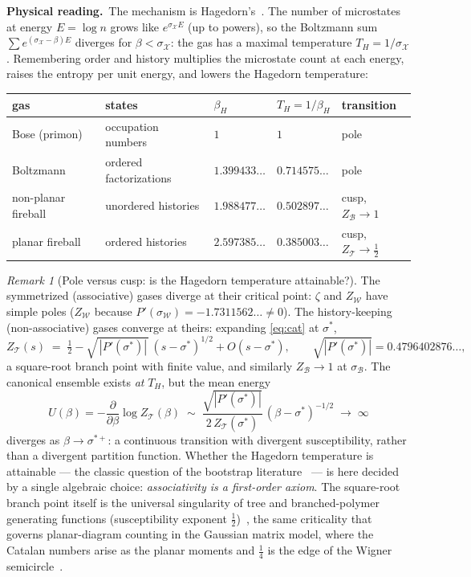 \documentclass[11pt]{article}
\newcommand{\cT}{\mathcal{T}}   %
\newcommand{\cW}{\mathcal{W}}   %
\newcommand{\cB}{\mathcal{B}}   %
\newcommand{\physread}{\medskip\noindent\textbf{Physical reading.}\ }
\numberwithin{equation}{section}
\theoremstyle{plain}
\theoremstyle{definition}
\theoremstyle{remark}
\newtheorem{remark}[theorem]{Remark}
\begin{document}
\physread The mechanism is Hagedorn's~\cite{hagedorn}. The number of microstates at
energy $E = \log n$ grows like $e^{\sigma_{\mathcal X} E}$ (up to powers), so the
Boltzmann sum $\sum e^{(\sigma_{\mathcal X} - \beta)E}$ diverges for
$\beta < \sigma_{\mathcal X}$: the gas has a maximal temperature
$T_H = 1/\sigma_{\mathcal X}$. Remembering order and history multiplies the microstate
count at each energy, raises the entropy per unit energy, and lowers the Hagedorn
temperature:

\begin{center}
\begin{tabular}{@{}lllll@{}}
\toprule
gas & states & $\beta_H$ & $T_H = 1/\beta_H$ & transition \\
\midrule
Bose (primon) & occupation numbers & $1$ & $1$ & pole \\
Boltzmann & ordered factorizations & $1.399433\dots$ & $0.714575\dots$ & pole \\
non-planar fireball & unordered histories & $1.988477\dots$ & $0.502897\dots$ & cusp, $Z_\cB \to 1$ \\
planar fireball & ordered histories & $2.597385\dots$ & $0.385003\dots$ & cusp, $Z_\cT \to \tfrac12$ \\
\bottomrule
\end{tabular}
\end{center}

\begin{remark}[Pole versus cusp: is the Hagedorn temperature attainable?]
\label{rem:cusp}
The symmetrized (associative) gases diverge at their critical point: $\zeta$ and
$Z_\cW$ have simple poles ($Z_\cW$ because $P'(\sigma_\cW) = -1.7311562\dots \ne 0$).
The history-keeping (non-associative) gases converge at theirs: expanding
\eqref{eq:cat} at $\sigma^{*}$,
\[
Z_\cT(s) \;=\; \tfrac12 - \sqrt{\,|P'(\sigma^{*})|\,}\,(s-\sigma^{*})^{1/2} + O(s-\sigma^{*}),
\qquad \sqrt{|P'(\sigma^{*})|} = 0.4796402876\dots,
\]
a square-root branch point with finite value, and similarly $Z_\cB \to 1$ at
$\sigma_\cB$. The canonical ensemble exists \emph{at} $T_H$, but the mean energy
\[
U(\beta) = -\frac{\partial}{\partial \beta} \log Z_\cT(\beta)
\;\sim\; \frac{\sqrt{|P'(\sigma^{*})|}}{2\,Z_\cT(\sigma^{*})}\,(\beta - \sigma^{*})^{-1/2}
\;\to\; \infty
\]
diverges as $\beta \to \sigma^{*+}$: a continuous transition with divergent
susceptibility, rather than a divergent partition function. Whether the Hagedorn
temperature is attainable --- the classic question of the bootstrap
literature~\cite{nahm} --- is here decided by a single algebraic choice:
\emph{associativity is a first-order axiom}. The square-root branch point itself is
the universal singularity of tree and branched-polymer generating functions
(susceptibility exponent $\tfrac12$)~\cite{adj}, the same criticality that governs
planar-diagram counting in the Gaussian matrix model, where the Catalan numbers arise
as the planar moments and $\tfrac14$ is the edge of the Wigner
semicircle~\cite{bipz}.
\end{remark}
\end{document}
